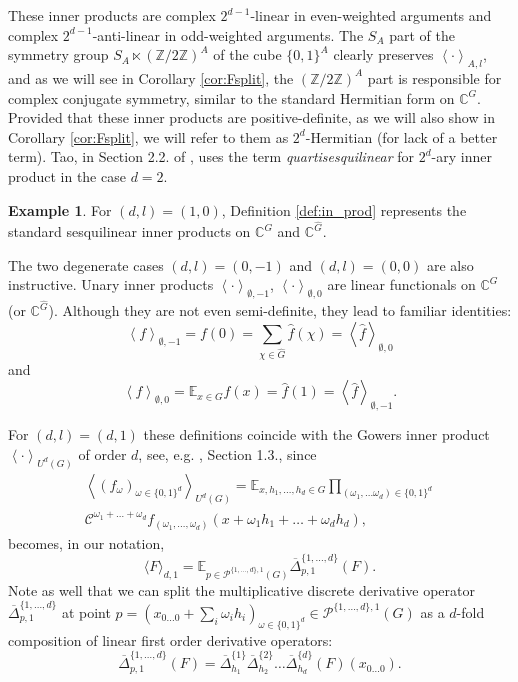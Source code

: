 \documentclass{amsart}
\theoremstyle{definition}
\newtheorem{example}[theorem]{Example}
\theoremstyle{remark}
\numberwithin{equation}{section}
\begin{document}
These inner products are complex $2^{d-1}$-linear in even-weighted arguments and complex $2^{d-1}$-anti-linear in odd-weighted arguments. The $S_A$ part of the symmetry group $S_A \ltimes (\mathbb{Z}/2\mathbb{Z})^A$ of the cube $\{0,1\}^A$ clearly preserves $\left\langle \cdot \right\rangle_{A,l}$, and as we will see in Corollary \ref{cor:Fsplit}, the $(\mathbb{Z}/2\mathbb{Z})^A$ part is responsible for complex conjugate symmetry, similar to the standard Hermitian form on $\mathbb{C}^G$. 
Provided that these inner products are positive-definite, as we will also show in Corollary \ref{cor:Fsplit}, we will refer to them as $2^d$-Hermitian (for lack of a better term).  Tao, in Section 2.2. of \cite{Tao12}, uses the term \textit{quartisesquilinear} for $2^d$-ary inner product in the case $d=2$.

\begin{example}
 For  $(d,l)=(1,0)$, Definition \ref{def:in_prod} represents
the standard sesquilinear inner products on $\mathbb{C}^G$ and $\mathbb{C}^{\widehat{G}}$.

The two degenerate cases $(d,l)=(0,-1)$ and $(d,l)=(0,0)$ are also instructive. Unary inner products  $\left\langle \cdot \right\rangle_{\emptyset,-1}$,   $\left\langle \cdot \right\rangle_{\emptyset,0}$ are linear functionals on $\mathbb{C}^G$ (or $\mathbb{C}^{\widehat{G}}$). Although they are not even semi-definite, they lead to familiar identities:
$$ \left\langle f \right\rangle_{\emptyset,-1} = f(0) = \sum_{\chi \in \widehat{G}} \widehat{f}(\chi) =  \left\langle \widehat{f} \right\rangle_{\emptyset,0} $$
and
$$ \left\langle f \right\rangle_{\emptyset,0} = \mathbb{E}_{x \in G} f(x) = \widehat{f}(1) =  \left\langle \widehat{f} \right\rangle_{\emptyset,-1} .$$


For $(d,l)=(d,1)$ these definitions coincide with the
Gowers inner product $\left\langle \cdot \right\rangle_{U^d(G)}$ of order $d$, see, e.g. \cite{Tao12}, Section 1.3., since
\begin{multline*}
\left\langle (f_\omega)_{\omega \in  \{0,1\}^d} \right\rangle_{U^d(G)} = \mathbb{E}_{x,h_1, \dots , h_d \in G} \prod_{(\omega_1, \dots \omega_d) \in  \{0,1\}^d} \\
\mathcal{C}^{\omega_1 + \dots + \omega_d} f_{(\omega_1, \dots, \omega_d)} (x + \omega_1 h_1 + \dots + \omega_d h_d),\end{multline*} 
becomes, in our notation,
$$ \langle F \rangle_{d,1} = \mathbb{E}_{p \in \mathcal{P}^{\{1, \dots, d\},1}(G)} \overline{\Delta}^{\{1, \dots, d\}}_{p,1} (F).$$ 
Note as well that we can split the multiplicative discrete derivative operator $\overline{\Delta}^{\{1, \dots, d\}}_{p,1}$  at point $p = \left(x_{0\dots0} + \sum_i \omega_i h_i\right)_{\omega \in  \{0,1\}^d} \in \mathcal{P}^{\{1, \dots, d\},1}(G)$ as a $d$-fold composition of linear first order derivative operators:
$$ \overline{\Delta}^{\{1, \dots, d\}}_{p,1} (F) = \overline{\Delta}^{\{1\}}_{h_1} \overline{\Delta}^{\{2\}}_{h_2} \dots \overline{\Delta}^{\{d\}}_{h_d} (F)(x_{0 \dots 0}).$$
\end{example}
\end{document}

